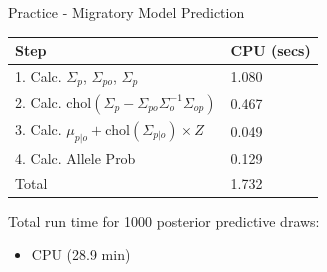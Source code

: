 \documentclass[11pt,ignorenonframetext,]{beamer}
\providecommand{\tightlist}{%
  \setlength{\itemsep}{0pt}\setlength{\parskip}{0pt}}
\begin{document}
\begin{frame}{Practice - Migratory Model Prediction}
\begin{longtable}[]{@{}ll@{}}
\toprule
\begin{minipage}[b]{0.59\columnwidth}\raggedright
Step\strut
\end{minipage} & \begin{minipage}[b]{0.35\columnwidth}\raggedright
CPU (secs)\strut
\end{minipage}\tabularnewline
\midrule
\endhead
\begin{minipage}[t]{0.59\columnwidth}\raggedright
1. Calc. \(\Sigma_p\), \(\Sigma_{po}\), \(\Sigma_{p}\)\strut
\end{minipage} & \begin{minipage}[t]{0.35\columnwidth}\raggedright
1.080\strut
\end{minipage}\tabularnewline
\begin{minipage}[t]{0.59\columnwidth}\raggedright
2. Calc.
\(\text{chol}(\Sigma_p - \Sigma_{po} \Sigma_{o}^{-1} \Sigma_{op})\)\strut
\end{minipage} & \begin{minipage}[t]{0.35\columnwidth}\raggedright
0.467\strut
\end{minipage}\tabularnewline
\begin{minipage}[t]{0.59\columnwidth}\raggedright
3. Calc. \(\mu_{p|o} + \text{chol}(\Sigma_{p|o}) \times Z\)\strut
\end{minipage} & \begin{minipage}[t]{0.35\columnwidth}\raggedright
0.049\strut
\end{minipage}\tabularnewline
\begin{minipage}[t]{0.59\columnwidth}\raggedright
4. Calc. Allele Prob\strut
\end{minipage} & \begin{minipage}[t]{0.35\columnwidth}\raggedright
0.129\strut
\end{minipage}\tabularnewline
\begin{minipage}[t]{0.59\columnwidth}\raggedright
Total\strut
\end{minipage} & \begin{minipage}[t]{0.35\columnwidth}\raggedright
1.732\strut
\end{minipage}\tabularnewline
\bottomrule
\end{longtable}

\normalsize

Total run time for 1000 posterior predictive draws:

\begin{itemize}
\tightlist
\item
  CPU (28.9 min)
\end{itemize}

\end{frame}
\end{document}
